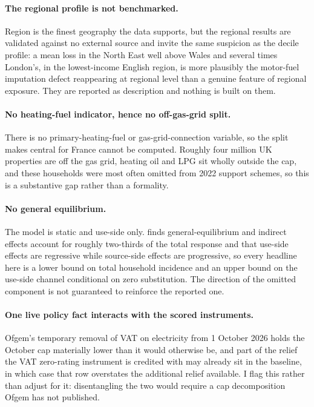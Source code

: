 \paragraph{The regional profile is not benchmarked.} Region is the finest geography the data supports, but the regional results are validated against no external source and invite the same suspicion as the decile profile: a mean loss in the North East well above Wales and several times London's, in the lowest-income English region, is more plausibly the motor-fuel imputation defect reappearing at regional level than a genuine feature of regional exposure. They are reported as description and nothing is built on them.

\paragraph{No heating-fuel indicator, hence no off-gas-grid split.} There is no primary-heating-fuel or gas-grid-connection variable, so the split \citet{douenne2020} makes central for France cannot be computed. Roughly four million UK properties are off the gas grid, heating oil and LPG sit wholly outside the cap, and these households were most often omitted from 2022 support schemes, so this is a substantive gap rather than a formality.

\paragraph{No general equilibrium.} The model is static and use-side only. \citet{kanzig2023} finds general-equilibrium and indirect effects account for roughly two-thirds of the total response and \citet{goulder2019} that use-side effects are regressive while source-side effects are progressive, so every headline here is a lower bound on total household incidence and an upper bound on the use-side channel conditional on zero substitution. The direction of the omitted component is not guaranteed to reinforce the reported one.

\paragraph{One live policy fact interacts with the scored instruments.} Ofgem's temporary removal of VAT on electricity from 1 October 2026 holds the October cap materially lower than it would otherwise be, and part of the relief the VAT zero-rating instrument is credited with may already sit in the baseline, in which case that row overstates the additional relief available. I flag this rather than adjust for it: disentangling the two would require a cap decomposition Ofgem has not published.

